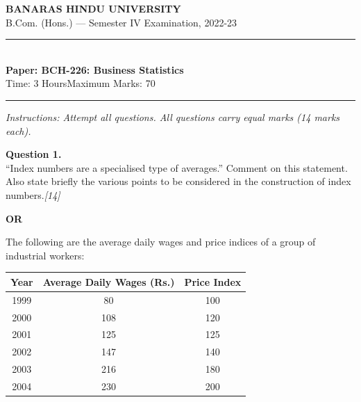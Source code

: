 \documentclass[11pt,a4paper]{article}
\newcommand{\pts}[1]{\hfill   \textit{[#1]}}
\begin{document}
\begin{center}
  {\large\bfseries BANARAS HINDU UNIVERSITY}\\[2pt]
  {\normalsize B.Com. (Hons.) --- Semester IV Examination, 2022-23}\\[6pt]
  \rule{0.8\linewidth}{0.5pt}\\[6pt]
  {\large\bfseries Paper: BCH-226: Business Statistics}\\[4pt]
  {\normalsize Time: 3 Hours\hfill Maximum Marks: 70}
\end{center}

\rule{\linewidth}{0.4pt}

\smallskip



\noindent   \textit{Instructions: Attempt all questions. All questions carry equal marks (14 marks each).}

\bigskip




\noindent   \textbf{Question 1.} \\
``Index numbers are a specialised type of averages.'' Comment on this statement. Also state briefly the various points to be considered in the construction of index numbers.\pts{14}

\centerline{   \textbf{OR}}

The following are the average daily wages and price indices of a group of industrial workers:

\begin{center}
\renewcommand{\arraystretch}{1.2}
\small

\begin{tabular}{|c|c|c|}
\hline
   \textbf{Year} &   \textbf{Average Daily Wages (Rs.)} &   \textbf{Price Index} \\ \hline
1999          & 80                                 & 100                  \\
2000          & 108                                & 120                  \\
2001          & 125                                & 125                  \\
2002          & 147                                & 140                  \\
2003          & 216                                & 180                  \\
2004          & 230                                & 200                  \\ \hline
\end{tabular}
\end{center}
\end{document}
